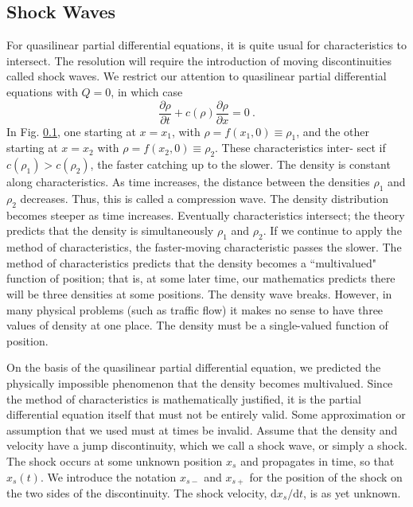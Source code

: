 \documentclass[12pt,a4paper]{article}
\newcommand{\dif}{\mathrm{d}}
\begin{document}
\subsection{Shock Waves}
\cite{haberman2013applied} For quasilinear partial differential equations, it is quite usual for characteristics to intersect. The resolution will require the introduction of moving discontinuities called shock waves. We restrict our attention to quasilinear partial differential equations with $Q = 0$, in which case
\begin{equation}
\dfrac{\partial \rho}{\partial t} +c(\rho) \dfrac{\partial \rho }{\partial x} = 0 ~.
\end{equation}
In Fig. \ref{}, one starting at $x = x_1$, with $\rho = f(x_1,0) \equiv \rho_1$, and the other starting at $x = x_2$ with $\rho = f(x_2,0) \equiv \rho_2$. These characteristics inter- sect if $c(\rho_1) > c(\rho_2)$, the faster catching up to the slower. The density is constant along characteristics. As time increases, the distance between the densities $\rho_1$ and $\rho_2$ decreases. Thus, this is called a compression wave. The density distribution becomes steeper as time increases. Eventually characteristics intersect; the theory predicts that the density is simultaneously $\rho_1$ and $\rho_2$. If we continue to apply the method of characteristics, the faster-moving characteristic passes the slower. The method of characteristics predicts that the density becomes a ``multivalued" function of position; that is, at some later time, our mathematics predicts there will be three densities at some positions. The density wave breaks. However, in many physical problems (such as traffic flow) it makes no sense to have three values of density at one place. The density must be a single-valued function of position. 


On the basis of the quasilinear partial differential equation, we predicted the physically impossible phenomenon that the density becomes multivalued. Since the method of characteristics is mathematically justified, it is the partial differential equation itself that must not be entirely valid. Some approximation or assumption that we used must at times be invalid. Assume that the density  and velocity have a jump discontinuity, which we call a shock wave, or simply a shock. The shock occurs at some unknown position $x_s$ and propagates in time, so that $x_s(t)$. We introduce the notation $x_{s-}$ and $x_{s+}$ for the position of the shock on the two sides of the discontinuity. The shock velocity, $\dif x_s/ \dif t$, is as yet unknown.
\end{document}
